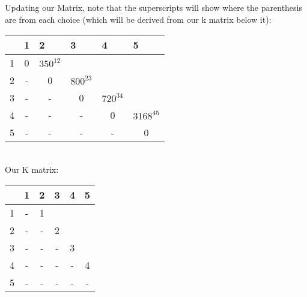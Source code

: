 \documentclass[12pt]{article}
\begin{document}
Updating our Matrix, note that the superscripts will show where the parenthesis are from each choice (which will be derived from our k matrix below it):
\begin{table}[h]
\centering
\begin{tabular}{|c|c|c|c|c|c|}
\hline
\multicolumn{1}{|l|}{} & \multicolumn{1}{|l|}{1} & \multicolumn{1}{l|}{2} & \multicolumn{1}{l|}{3} & \multicolumn{1}{l|}{4} & \multicolumn{1}{l|}{5} \\ \hline
1&0                       & $350^{12}$                     &                       &                       &                   \\ \hline
2&-                       & 0                     & $800^{23} $                     &                       &                   \\ \hline
3&-                       & -                     & 0                     & $ 720^{34} $                    &                       \\ \hline
4&-                       & -                     & -                     & 0                     & $ 3168^{45}$                     \\ \hline
5&-                       & -                     & -                     & -                     &    0                   \\ \hline
\end{tabular}
\end{table}
\\
Our K matrix:\\
\begin{table}[h]
\centering
\begin{tabular}{|c|c|c|c|c|c|}
\hline
\multicolumn{1}{|l|}{} & \multicolumn{1}{|l|}{1} & \multicolumn{1}{l|}{2} & \multicolumn{1}{l|}{3} & \multicolumn{1}{l|}{4} & \multicolumn{1}{l|}{5} \\ \hline
1&  -                   &     1                 &                       &                       &                   \\ \hline
2&-                       & -                     &      2                 &                       &                   \\ \hline
3&-                       & -                     & -                     &     3                  &                       \\ \hline
4&-                       & -                     & -                     & -                     &   4                    \\ \hline
5&-                       & -                     & -                     & -                     &   -                   \\ \hline
\end{tabular}
\end{table}
\end{document}
